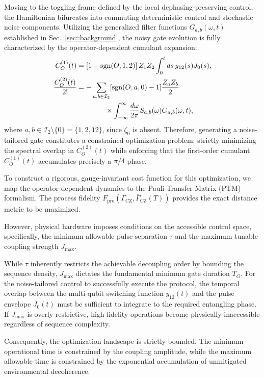 \documentclass[%
 reprint,
superscriptaddress,
 amsmath,amssymb,
 aps,
pra,
floatfix,
]{revtex4-2}
\newcommand{\qk}[1]{{\color{OliveGreen}#1}}
\begin{document}
Moving to the toggling frame defined by the local dephasing-preserving control, the Hamiltonian bifurcates into commuting deterministic control and stochastic noise components. Utilizing the generalized filter functions $G_{a,b}(\omega,t)$ established in Sec.~\ref{sec::background}, the noisy gate evolution is fully characterized by the operator-dependent cumulant expansion:
\begin{align}
    C_O^{(1)}(t)&=\left[1-\text{sgn}(O,1,2)\right]Z_1Z_2\int_0^t ds \, y_{12}(s)J_0(s),\\
    \frac{C_{O}^{(2)}(t)}{2!}&=-\sum_{a,b\in\mathcal{I}_2}[\text{sgn}(O,a,0)-1]\frac{Z_aZ_b}{2}\notag\\
    &\qquad\qquad\times\int_{-\infty}^{\infty}\frac{d\omega}{2\pi}S_{a,b}(\omega)G_{a,b}(\omega,t),
\end{align}
where \qk{$a,b\in\mathcal{I}_2\setminus\{0\}=\{1,2,12\}$, since $\zeta_0$ is absent}. Therefore, generating a noise-tailored gate constitutes a constrained optimization problem: strictly minimizing the spectral overlap in $C_O^{(2)}(t)$ while enforcing that the first-order cumulant $C_O^{(1)}(t)$ accumulates precisely a $\pi/4$ phase.

To construct a rigorous, gauge-invariant cost function for this optimization, we map the operator-dependent dynamics to the Pauli Transfer Matrix (PTM) formalism. The process fidelity $F_{\text{pro}}(\Gamma_{\text{CZ}}, \overline{\Gamma}_{\text{CZ}}(T))$ provides the exact distance metric to be maximized.

However, physical hardware imposes conditions on the accessible control space, specifically, the minimum allowable pulse separation $\tau$ and the maximum tunable coupling strength $J_{\text{max}}$. 

While $\tau$ inherently restricts the achievable decoupling order by bounding the sequence density, $J_{\text{max}}$ dictates the fundamental minimum gate duration $T_G$. For the noise-tailored control to successfully execute the protocol, the temporal overlap between the multi-qubit switching function $y_{12}(t)$ and the pulse envelope $J_0(t)$ must be sufficient to integrate to the required entangling phase. If $J_{\text{max}}$ is overly restrictive, high-fidelity operations become physically inaccessible regardless of sequence complexity. 

Consequently, the optimization landscape is strictly bounded. The minimum operational time is constrained by the coupling amplitude, while the maximum allowable time is constrained by the exponential accumulation of unmitigated environmental decoherence.
\end{document}
